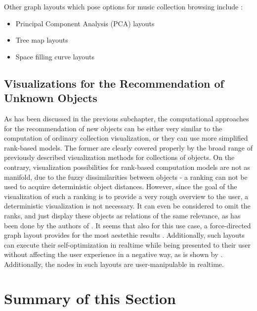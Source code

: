 Other graph layouts which pose options for music collection browsing include \cite{Muelder:2010fk}:

\begin{itemize}
	\item Principal Component Analysis (PCA) layouts 
	\item Tree map layouts 
	\item Space filling curve layouts
\end{itemize}

\subsection{Visualizations for the Recommendation of Unknown Objects}

As has been discussed in the previous subchapter, the computational approaches for the recommendation of new objects can be either very similar to the computation of ordinary collection visualization, or they can use more simplified rank-based models. The former are clearly covered properly by the broad range of previously described visualization methods for collections of objects.
On the contrary, visualization possibilities for rank-based computation models are not as manifold, due to the fuzzy dissimilarities between objects - a ranking can not be used to acquire deterministic object distances. However, since the goal of the visualization of such a ranking is to provide a very rough overview to the user, a deterministic visualization is not necessary. It can even be considered to omit the ranks, and just display these objects as relations of the same relevance, as has been done by the authors of \cite{DBLP:conf/webist/SarmentoGCO09}. It seems that also for this use case, a force-directed graph layout provides for the most aestethic results \cite{DBLP:journals/spe/FruchtermanR91}. Additionally, such layouts can execute their self-optimization in realtime while being presented to their user without affecting the user experience in a negative way, as is shown by \cite{url:tuneglue}. Additionally, the nodes in such layouts are user-manipulable in realtime.



\section{Summary of this Section}